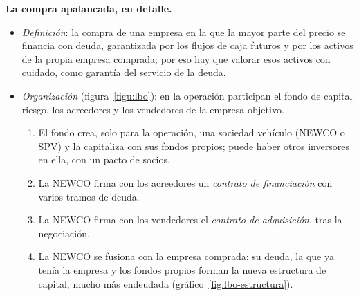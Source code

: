 \documentclass[11pt]{article}
\begin{document}
\begin{infografia}[H]
\centering
\caption{La compra apalancada (LBO): la sociedad vehículo, sus financiadores y los vendedores}\label{figu:lbo}
\end{infografia}

\begin{anotaciones}
\textbf{La compra apalancada, en detalle.}
\begin{itemize}
\item \emph{Definición}: la compra de una empresa en la que la mayor parte del precio se financia con deuda, garantizada por los flujos de caja futuros y por los activos de la propia empresa comprada; por eso hay que valorar esos activos con cuidado, como garantía del servicio de la deuda.
\item \emph{Organización} (figura~\ref{figu:lbo}): en la operación participan el fondo de capital riesgo, los acreedores y los vendedores de la empresa objetivo.
  \begin{enumerate}
  \item El fondo crea, solo para la operación, una sociedad vehículo (NEWCO o SPV) y la capitaliza con sus fondos propios; puede haber otros inversores en ella, con un pacto de socios.
  \item La NEWCO firma con los acreedores un \emph{contrato de financiación} con varios tramos de deuda.
  \item La NEWCO firma con los vendedores el \emph{contrato de adquisición}, tras la negociación.
  \item La NEWCO se fusiona con la empresa comprada: su deuda, la que ya tenía la empresa y los fondos propios forman la nueva estructura de capital, mucho más endeudada (gráfico~\ref{fig:lbo-estructura}).
  \end{enumerate}
\end{itemize}

\begin{figuracaja}
\centering
\caption{La estructura de capital antes y después de una compra apalancada (datos ilustrativos)}\label{fig:lbo-estructura}
\end{figuracaja}


\end{anotaciones}
\end{document}
